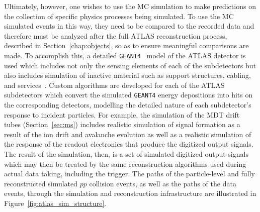 Ultimately, however, one wishes to use the MC simulation to make predictions on the collection of specific physics
processes being simulated.
To use the MC simulated events in this way, they need to be compared to the recorded data and therefore must be analyzed after
the full ATLAS reconstruction process, described in Section~\ref{chap:objects}, so as to ensure meaningful comparisons are made.
To accomplish this, a detailed \texttt{GEANT4}~\cite{GEANT4} model of the ATLAS detector is used
which includes not only the sensing elements of each of the subdetectors but also includes
simulation of inactive material such as support structures, cabling, and services~\cite{ATLASSim}.
Custom algorithms are developed for each of the ATLAS subdetectors which convert the simulated \texttt{GEANT4}
energy depositions into hits on the corresponding detectors, modelling the detailed nature
of each subdetector's response to incident particles.
For example, the simulation of the MDT drift tubes (Section~\ref{sec:ms}) includes realistic simulation of signal formation as a result of the ion
drift and avalanche evolution as well as a realistic simulation of the response
of the readout electronics that produce the digitized output signals.
The result of the simulation, then, is a set of simulated digitized output signals which
may then be treated by the same reconstruction algorithms used during actual data taking, including the trigger.
The paths of the particle-level and fully reconstructed simulated $pp$ collision events, as well
as the paths of the data events, through the simulation and reconstruction infrastructure are illustrated in Figure~\ref{fig:atlas_sim_structure}.

{\color{red}{How is pileup simulated?}}

